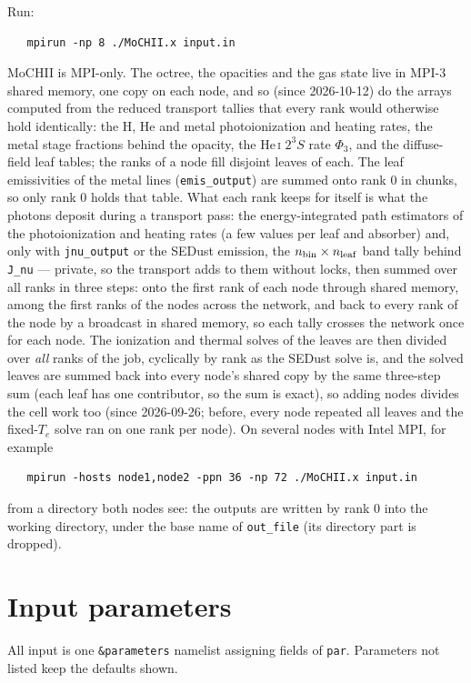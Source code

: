 \documentclass[english,a4paper]{my_memo}
\newcommand{\code}[1]{\texttt{#1}}
\begin{document}
Run:
\begin{verbatim}
   mpirun -np 8 ./MoCHII.x input.in
\end{verbatim}
MoCHII is MPI-only.  The octree, the opacities and the gas state live in
MPI-3 shared memory, one copy on each node, and so (since 2026-10-12) do
the arrays computed from the reduced transport tallies that every rank
would otherwise hold identically: the H, He and metal photoionization and
heating rates, the metal stage fractions behind the opacity, the He\,\textsc{i}
$2^3S$ rate $\Phi_3$, and the diffuse-field leaf tables; the ranks of a
node fill disjoint leaves of each.  The leaf emissivities of the metal
lines (\code{emis\_output}) are summed onto rank 0 in chunks, so only rank
0 holds that table.  What each rank keeps for
itself is what the photons deposit during a transport pass: the
energy-integrated path estimators of the photoionization and heating rates
(a few values per leaf and absorber) and, only with \code{jnu\_output} or
the SEDust emission, the $n_{\rm bin}\times n_{\rm leaf}$ band tally behind
\code{J\_nu} --- private, so the transport adds to them without locks, then
summed over all ranks in three steps: onto the first rank of each node
through shared memory, among the first ranks of the nodes across the
network, and back to every rank of the node by a broadcast in shared
memory, so each tally crosses the network once for each node.  The ionization and thermal solves of the leaves are then
divided over \emph{all} ranks of the job, cyclically by rank as the SEDust
solve is, and the solved leaves are summed back into every node's shared
copy by the same three-step sum (each leaf has one contributor, so the
sum is exact), so adding nodes
divides the cell work too (since 2026-09-26; before, every node repeated
all leaves and the fixed-$T_e$ solve ran on one rank per node).  On several
nodes with Intel MPI, for example
\begin{verbatim}
   mpirun -hosts node1,node2 -ppn 36 -np 72 ./MoCHII.x input.in
\end{verbatim}
from a directory both nodes see: the outputs are written by rank 0 into
the working directory, under the base name of \code{out\_file} (its
directory part is dropped).

\section{Input parameters}
All input is one \code{\&parameters} namelist assigning fields of
\code{par}.  Parameters not listed keep the defaults shown.
\end{document}
